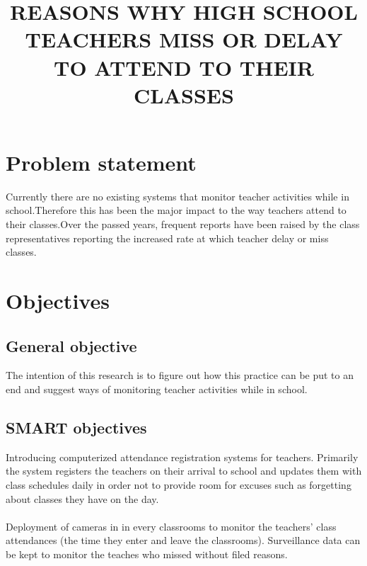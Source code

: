 \documentclass[12pt]{article}
\title{\textbf{REASONS WHY HIGH SCHOOL TEACHERS MISS OR DELAY TO ATTEND TO THEIR CLASSES}}
\date{}
\begin{document}
\maketitle

\section{Problem statement}
Currently there are no existing systems that monitor teacher activities while in school.Therefore this has been the major impact to the way teachers attend to their classes.Over the passed years, frequent reports have been raised by the class representatives reporting the increased rate at which teacher delay or miss classes. 

\section{Objectives}

\subsection{General objective}
The intention of this research is to figure out how this practice can be put to an end and suggest ways of monitoring teacher activities while in school.
\subsection{SMART objectives}
Introducing computerized attendance registration systems for teachers. Primarily the system registers the teachers on their arrival to school and updates them with class schedules daily in order not to provide room for excuses such as forgetting about classes they have on the day.\\
\\Deployment of cameras in in every classrooms to monitor the teachers' class attendances (the time they enter and leave the classrooms). Surveillance data can be kept to monitor the teaches who missed without filed reasons. 
\end{document}
